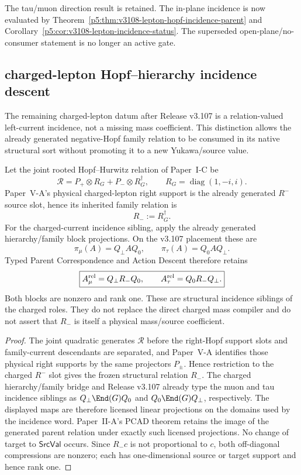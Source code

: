 \documentclass[12pt,a4paper]{article}
\begin{document}
The tau/muon direction result is retained. The in-plane incidence is
now evaluated by Theorem~\ref{p5:thm:v3108-lepton-hopf-incidence-parent}
and Corollary~\ref{p5:cor:v3108-lepton-incidence-status}.
The superseded open-plane/no-consumer statement is no longer an active gate.



\subsection{charged-lepton Hopf--hierarchy incidence descent}
\label{p5:sec:v3108-lepton-hopf-pcad-incidence}
The remaining charged-lepton datum after Release v3.107 is a relation-valued
left-current incidence, not a missing mass coefficient.  This distinction
allows the already generated negative-Hopf family relation to be consumed in
its native structural sort without promoting it to a new Yukawa/source value.

\begin{theorem}
\label{p5:thm:v3108-lepton-hopf-incidence-parent}
Let the joint rooted Hopf--Hurwitz relation of Paper~I-C be
\[
 \mathscr R=P_+\otimes R_G+P_-\otimes R_G^\dagger,
 \qquad R_G=\operatorname{diag}(1,-i,i).
\]
Paper~V-A's physical charged-lepton right support is the already generated
$R^-$ source slot, hence its inherited family relation is
\[
 \boxed{R_-:=R_G^\dagger.}
\]
For the charged-current incidence sibling, apply the already generated
hierarchy/family block projections.  On the v3.107 placement these are
\[
 \pi_\mu(A)=Q_\perp A Q_0,
 \qquad
 \pi_\tau(A)=Q_0 A Q_\perp .
\]
Typed Parent Correspondence and Action Descent therefore retains
\[
 \boxed{A_\mu^{\rm rel}=Q_\perp R_-Q_0,
 \qquad A_\tau^{\rm rel}=Q_0R_-Q_\perp.}
\]
Both blocks are nonzero and rank one.  These are structural incidence
siblings of the charged roles.  They do not replace the direct charged mass
compiler and do not assert that $R_-$ is itself a physical mass/source
coefficient.
\end{theorem}
\begin{proof}
The joint quadratic generates $\mathscr R$ before the right-Hopf support slots
and family-current descendants are separated, and Paper~V-A identifies those
physical right supports by the same projectors $P_\pm$.  Hence restriction to
the charged $R^-$ slot gives the frozen structural relation $R_-$.  The
charged hierarchy/family bridge and Release v3.107 already type the muon and
tau incidence siblings as $Q_\perp\End(G)Q_0$ and
$Q_0\End(G)Q_\perp$, respectively.  The displayed maps are therefore licensed
linear projections on the domains used by the incidence word.  Paper~II-A's
PCAD theorem retains the image of the generated parent relation under exactly
such licensed projections.  No change of target to \(\mathsf{SrcVal}\) occurs.
Since $R_-c$ is not proportional to $c$, both off-diagonal compressions are
nonzero; each has one-dimensional source or target support and hence rank one.
\end{proof}
\end{document}
